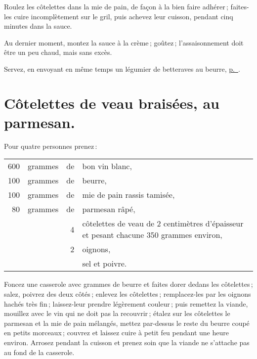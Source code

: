 Roulez les côtelettes dans la mie de pain, de façon à la bien faire adhérer ;
faites-les cuire incomplètement sur le gril, puis achevez leur cuisson, pendant
cinq minutes dans la sauce.

Au dernier moment, montez la sauce à la crème ; goûtez ; l'assaisonnement doit
être un peu chaud, mais sans excès.

Servez, en envoyant en même temps un légumier de betteraves au beurre, \hyperlink{p0780}{p. \pageref{pg0780}}.

\section*{\centering Côtelettes de veau braisées, au parmesan.}
{}

Pour quatre personnes prenez :

\medskip

\footnotesize
\begin{longtable}{rrrp{16em}}
    600 & grammes & de & bon vin blanc,                                                                   \\
    100 & grammes & de & beurre,                                                                          \\
    100 & grammes & de & mie de pain rassis tamisée,                                                      \\
     80 & grammes & de & parmesan râpé,                                                                   \\
        &         &  4 & côtelettes de veau de 2 centimètres d'épaisseur
                         et pesant chacune 350 grammes environ,                                           \\
        &         &  2 & oignons,                                                                         \\
        &         &    & sel et poivre.                                                                   \\
\end{longtable}
\normalsize

Foncez une casserole avec {\mmm} grammes de beurre et faites dorer dedans les
côtelettes ; salez, poivrez des deux côtés ; enlevez les côtelettes ;
remplacez-les par les oignons hachés très fin ; laissez-leur prendre légèrement
couleur ; puis remettez la viande, mouillez avec le vin qui ne doit pas la
recouvrir ; étalez sur les côtelettes le parmesan et la mie de pain mélangés,
mettez par-dessus le reste du beurre coupé en petits morceaux ; couvrez et
laissez cuire à petit feu pendant une heure environ. Arrosez pendant la cuisson
et prenez soin que la viande ne s'attache pas au fond de la casserole.

